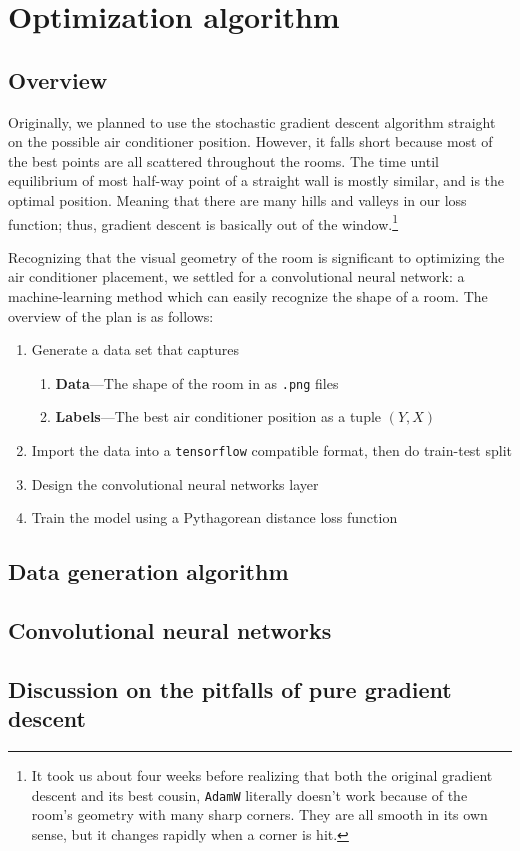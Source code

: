 \chapter{Optimization algorithm}

\section{Overview}

Originally, we planned to use the stochastic gradient descent algorithm straight on the possible air conditioner position. However, it falls short because most of the best points are all scattered throughout the rooms. The time until equilibrium of most half-way point of a straight wall is mostly similar, and is the optimal position. Meaning that there are many hills and valleys in our loss function; thus, gradient descent is basically out of the window.\footnote{It took us about four weeks before realizing that both the original gradient descent and its best cousin, \texttt{AdamW} literally doesn't work because of the room's geometry with many sharp corners. They are all smooth in its own sense, but it changes rapidly when a corner is hit.}

Recognizing that the visual geometry of the room is significant to optimizing the air conditioner placement, we settled for a convolutional neural network: a machine-learning method which can easily recognize the shape of a room. The overview of the plan is as follows:
\begin{enumerate}[noitemsep]
	\item Generate a data set that captures
	      \begin{enumerate}[noitemsep]
		      \item \textbf{Data}---The shape of the room in as \texttt{.png} files
		      \item \textbf{Labels}---The best air conditioner position as a tuple $(Y, X)$
	      \end{enumerate}
	\item Import the data into a \texttt{tensorflow} compatible format, then do train-test split
	\item Design the convolutional neural networks layer
	\item Train the model using a Pythagorean distance loss function
\end{enumerate}

\section{Data generation algorithm}

\section{Convolutional neural networks}

\section{Discussion on the pitfalls of pure gradient descent}
